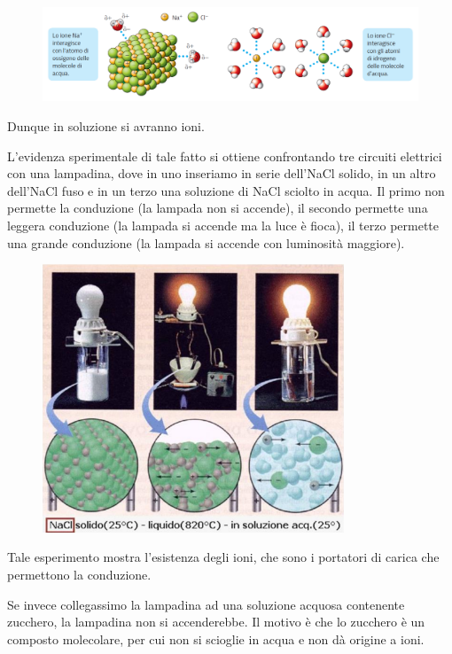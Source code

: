 \vspace{-0.3cm}\begin{figure}[htp]
    \centering
    \includegraphics[width=15cm]{immagini/interazione-acqua-ioni.png}
\end{figure}

\vspace{-0.3cm}Dunque in soluzione si avranno ioni.

L'evidenza sperimentale di tale fatto si ottiene confrontando tre circuiti elettrici con una lampadina, dove in uno inseriamo in serie dell'NaCl solido, in un altro dell'NaCl fuso e in un terzo una soluzione di NaCl sciolto in acqua. Il primo non permette la conduzione (la lampada non si accende), il secondo permette una leggera conduzione (la lampada si accende ma la luce è fioca), il terzo permette una grande conduzione (la lampada si accende con luminosità maggiore).

\begin{figure}[htp]
    \centering
    \includegraphics[width=9cm]{immagini/lampadina.png}
\end{figure}

Tale esperimento mostra l'esistenza degli ioni, che sono i portatori di carica che permettono la conduzione.

Se invece collegassimo la lampadina ad una soluzione acquosa contenente zucchero, la lampadina non si accenderebbe. Il motivo è che lo zucchero è un composto molecolare, per cui non si scioglie in acqua e non dà origine a ioni.
